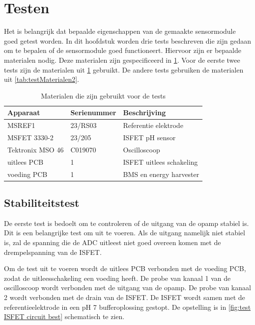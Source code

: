 \section{Testen}

Het is belangrijk dat bepaalde eigenschappen van de gemaakte sensormodule goed getest worden. In dit hoofdstuk worden drie tests beschreven die zijn gedaan om te bepalen of de sensormodule goed functioneert. Hiervoor zijn er bepaalde materialen nodig. Deze materialen zijn gespecificeerd in \cref{tab:testMaterialen}. Voor de eerste twee tests zijn de materialen uit \cref{tab:testMaterialen} gebruikt. De andere tests gebruiken de materialen uit \cref{tab:testMaterialen2}.

\begin{table}[ht]
    \centering
    \begin{tabular}{l|l|l}
        Apparaat         & Serienummer & Beschrijving \\
        \hline
        MSREF1           & 23/RS03     & Referentie elektrode       \\
        MSFET 3330-2     & 23/205      & ISFET pH sensor            \\
        Tektronix MSO 46 & C019070     & Oscilloscoop               \\
        uitlees PCB      & 1           & ISFET uitlees schakeling   \\
        voeding PCB      & 1           & BMS en energy harvester    \\    
        \hline
    \end{tabular}
    \caption{Materialen die zijn gebruikt voor de tests}
    \label{tab:testMaterialen}
\end{table}

\subsection{Stabiliteitstest}
De eerste test is bedoelt om te controleren of de uitgang van de opamp stabiel is. Dit is een belangrijke test om uit te voeren. Als de uitgang namelijk niet stabiel is, zal de spanning die de ADC uitleest niet goed overeen komen met de drempelspanning van de ISFET.

Om de test uit te voeren wordt de uitlees PCB verbonden met de voeding PCB, zodat de uitleesschakeling een voeding heeft. De probe van kanaal 1 van de oscilloscoop wordt verbonden met de uitgang van de opamp. De probe van kanaal 2 wordt verbonden met de drain van de ISFET. De ISFET wordt samen met de referentieelektrode in een pH 7 bufferoplossing gestopt. De opstelling is in \cref{fig:test ISFET circuit best} schematisch te zien.

